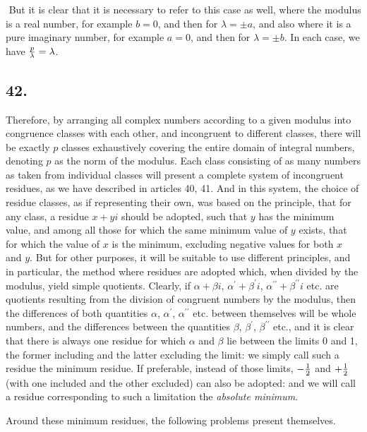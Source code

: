 \documentclass[twoside,12pt, showframe]{memoir}
\let\oldfrac\frac
\def\frac#1#2{\mathchoice{\tfrac{#1}{#2}}{\oldfrac{#1}{#2}}{\genfrac{}{}{}{2}{#1}{#2\mathstrut}}{\genfrac{}{}{}{3}{#1}{#2\mathstrut}}}
\begin{document}
\(\) But it is clear that it is necessary to refer to this case as well, where the modulus is a real number, for example \(b=0\), and then for \(\lambda= \pm a\), and also where it is a pure imaginary number, for example \(a=0\), and then for \(\lambda= \pm b\). In each case, we have \(\frac{p}{\lambda}=\lambda\).
%

\subsection*{42.}

Therefore, by arranging all complex numbers according to a given modulus into congruence classes with each other, and incongruent to different classes, there will be exactly \(p\) classes exhaustively covering the entire domain of integral numbers, denoting \(p\) as the norm of the modulus. Each class consisting of as many numbers as taken from individual classes will present a complete system of incongruent residues, as we have described in articles 40, 41. And in this system, the choice of residue classes, as if representing their own, was based on the principle, that for any class, a residue \(x+yi\) should be adopted, such that \(y\) has the minimum value, and among all those for which the same minimum value of \(y\) exists, that for which the value of \(x\) is the minimum, excluding negative values for both \(x\) and \(y\). But for other purposes, it will be suitable to use different principles, and in particular, the method where residues are adopted which, when divided by the modulus, yield simple quotients. Clearly, if \(\alpha+\beta i\), \(\alpha^{\prime}+\beta^{\prime} i\), \(\alpha^{\prime \prime}+\beta^{\prime \prime} i\) etc. are quotients resulting from the division of congruent numbers by the modulus, then the differences of both quantities \(\alpha\), \(\alpha^{\prime}\), \(\alpha^{\prime \prime}\) etc. between themselves will be whole numbers, and the differences between the quantities \(\beta\), \(\beta^{\prime}\), \(\beta^{\prime \prime}\) etc., and it is clear that there is always one residue for which \(\alpha\) and \(\beta\) lie between the limits 0 and 1, the former including and the latter excluding the limit: we simply call such a residue the minimum residue. If preferable, instead of those limits, \( -\frac{1}{2} \) and \( +\frac{1}{2} \) (with one included and the other excluded) can also be adopted: and we will call a residue corresponding to such a limitation the \textit{absolute minimum}.

Around these minimum residues, the following problems present themselves.
%
\end{document}
